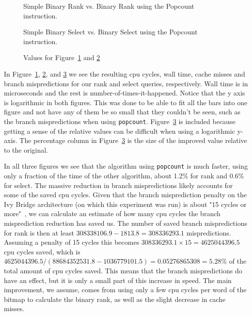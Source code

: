 \begin{figure}
\caption{Simple Binary Rank vs. Binary Rank using the Popcount instruction.}
\label{fig:rankPopcountDiff}

\end{figure}

\begin{figure}
\caption{Simple Binary Select vs. Binary Select using the Popcount instruction.}
\label{fig:selectPopcountDiff}

\end{figure}

\begin{figure}
\caption{Values for Figure~\ref{fig:rankPopcountDiff} and \ref{fig:selectPopcountDiff}}
\label{fig:valuesForPopcountDiff}

\end{figure}

In Figure~\ref{fig:rankPopcountDiff}, \ref{fig:selectPopcountDiff}, and \ref{fig:valuesForPopcountDiff} we see the resulting cpu cycles, wall time, cache misses and branch mispredictions for our rank and select queries, respectively.
Wall time is in microseconds and the rest is number-of-times-it-happened.
Notice that the y axis is logarithmic in both figures. This was done to be able to fit all the bars into one figure and not have any of them be so small that they couldn't be seen, such as the branch mispredictions when using \texttt{popcount}.
Figure~\ref{fig:valuesForPopcountDiff} is included because getting a sense of the relative values can be difficult when using a logarithmic y-axis.
The percentage column in Figure~\ref{fig:valuesForPopcountDiff} is the size of the improved value relative to the original.

In all three figures we see that the algorithm using \texttt{popcount} is much faster, using only a fraction of the time of the other algorithm, about 1.2\% for rank and 0.6\% for select.
The massive reduction in branch mispredictions likely accounts for some of the saved cpu cycles.
Given that the branch misprediction penalty on the Ivy Bridge architecture (on which this experiment was run) is about "15 cycles or more"~\cite{agner}, we can calculate an estimate of how many cpu cycles the branch misprediction reduction has saved us.
The number of saved branch mispredictions for rank is then at least $\num{308338106.9} - \num{1813.8} = \num{308336293.1}$ mispredictions. Assuming a penalty of 15 cycles this becomes $\num{308336293.1} \times 15 = \num{4625044396.5}$ cpu cycles saved, which is $\num{4625044396.5} / (\num{88684352531.8} - \num{1036779101.5}) = \num{0.05276865308} = 5.28\%$ of the total amount of cpu cycles saved.
This means that the branch mispredictions do have an effect, but it is only a small part of this increase in speed. The main improvement, we assume, comes from using only a few cpu cycles per word of the bitmap to calculate the binary rank, as well as the slight decrease in cache misses.

